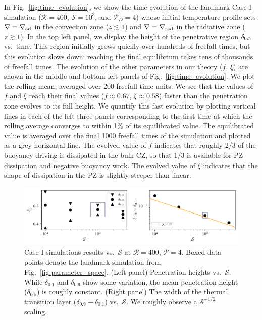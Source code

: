 \documentclass[twocolumn, linenumbers]{aastex631}
\newcommand{\gradrad}{\ensuremath{\nabla_{\rm{rad}}}}
\newcommand{\gradad}{\ensuremath{\nabla_{\rm{ad}}}}
\newcommand{\justgrad}{\ensuremath{\nabla}}
\newcommand{\mP}{\ensuremath{\mathcal{P}}}
\newcommand{\mR}{\ensuremath{\mathcal{R}}}
\newcommand{\mS}{\ensuremath{\mathcal{S}}}
\begin{document}
In Fig.~\ref{fig:time_evolution}, we show the time evolution of the landmark Case I simulation ($\mR = 400$, $\mS = 10^3$, and $\mP_D = 4$) whose initial temperature profile sets $\justgrad = \gradad$ in the convection zone ($z \lesssim 1$) and $\justgrad = \gradrad$ in the radiative zone ($z \gtrsim 1$).
In the top left panel, we display the height of the penetrative region $\delta_{\rm{0.5}}$ vs.~time.
This region initially grows quickly over hundreds of freefall times, but this evolution slows down; reaching the final equilibrium takes tens of thousands of freefall times.
The evolution of the other parameters in our theory ($f$, $\xi$) are shown in the middle and bottom left panels of Fig.~\ref{fig:time_evolution}.
We plot the rolling mean, averaged over 200 freefall time units. 
We see that the values of $f$ and $\xi$ reach their final values ($f \approx 0.67$, $\xi \approx 0.58$) faster than the penetration zone evolves to its full height.
We quantify this fast evolution by plotting vertical lines in each of the left three panels corresponding to the first time at which the rolling average converges to within 1\% of its equilibrated value.
The equilibrated value is averaged over the final 1000 freefall times of the simulation and plotted as a grey horizontal line.
The evolved value of $f$ indicates that roughly 2/3 of the buoyancy driving is dissipated in the bulk CZ, so that 1/3 is available for PZ dissipation and negative buoyancy work.
The evolved value of $\xi$ indicates that the shape of dissipation in the PZ is slightly steeper than linear.

\begin{figure}[t]
\centering
\includegraphics{parameters_vs_s.pdf}
\caption{
Case I simulations results vs.~$\mS$ at $\mR = 400$, $\mP = 4$.
Boxed data points denote the landmark simulation from Fig.~\ref{fig:parameter_space}.
(Left panel) Penetration heights vs.~$\mS$.
While $\delta_{0.1}$ and $\delta_{0.9}$ show some variation, the mean penetration height ($\delta_{0.5}$) is roughly constant.
(Right panel) The width of the thermal transition layer ($\delta_{0.9} - \delta_{0.1}$) vs.~$\mS$.
We roughly observe a $\mS^{-1/2}$ scaling.
\label{fig:parameters_vs_s}
}
\end{figure}
\end{document}

